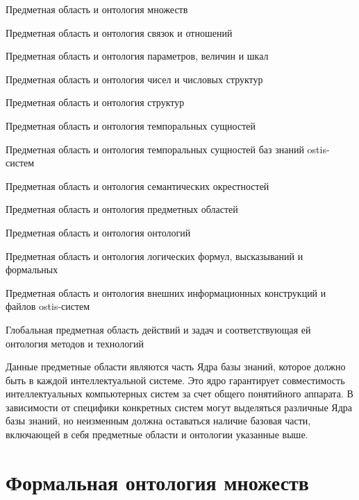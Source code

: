 \begin{textitemize}
\item Предметная область и онтология множеств
\item Предметная область и онтология связок и отношений
\item Предметная область и онтология параметров, величин и шкал
\item Предметная область и онтология чисел и числовых структур
\item Предметная область и онтология структур
\item Предметная область и онтология темпоральных сущностей
\item Предметная область и онтология темпоральных сущностей баз знаний ostis-систем
\item Предметная область и онтология семантических окрестностей
\item Предметная область и онтология предметных областей
\item Предметная область и онтология онтологий
\item Предметная область и онтология логических формул, высказываний и формальных %
\item Предметная область и онтология внешних информационных конструкций и файлов ostis-систем
\item Глобальная предметная область действий и задач и соответствующая ей онтология методов и технологий
\end{textitemize}

Данные предметные области являются часть Ядра базы знаний, которое должно быть в каждой интеллектуальной системе. Это ядро гарантирует совместимость интеллектуальных компьютерных систем за счет общего понятийного аппарата. В зависимости от специфики конкретных систем могут выделяться различные Ядра базы знаний, но неизменным должна оставаться наличие базовая части, включающей в себя предметные области и онтологии указанные выше.

\section{Формальная онтология множеств}
\label{sec_top_ontologies_set}

